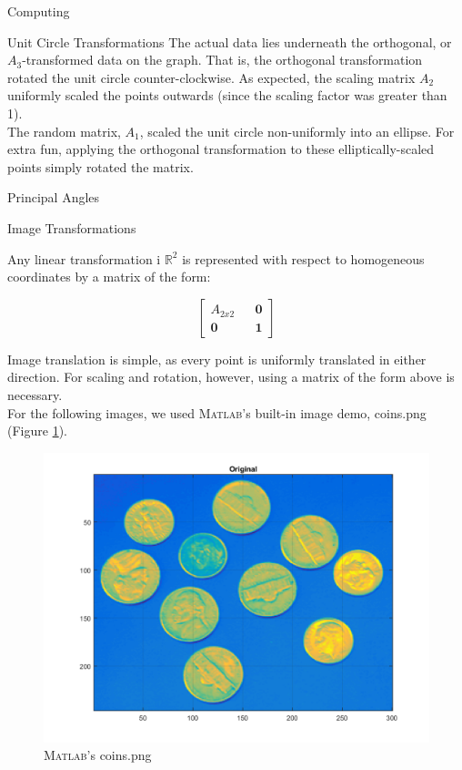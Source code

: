 \begin{section}{Computing}
\begin{homeworkSection}{Unit Circle Transformations}
The actual data lies underneath the orthogonal, or $A_3$-transformed data on the graph. That is, the orthogonal transformation rotated the unit circle counter-clockwise. As expected, the scaling matrix $A_2$ uniformly scaled the points outwards (since the scaling factor was greater than 1). 
\\

The random matrix, $A_1$, scaled the unit circle non-uniformly into an ellipse. For extra fun, applying the orthogonal transformation to these elliptically-scaled points simply rotated the matrix. 

\problemAnswer{

}
\end{homeworkSection}


\begin{homeworkSection}{Principal Angles}
\end{homeworkSection}


\begin{homeworkSection}{Image Transformations}

Any linear transformation i $\mathbb{R}^2$ is represented with respect to homogeneous coordinates by a matrix of the form:

$$
    \begin{bmatrix}
        A_{2 x 2} && \mathbf{0} \\ \mathbf{0}  && \mathbf{1}
    \end{bmatrix}
$$

Image translation is simple, as every point is uniformly translated in either direction. For scaling and rotation, however, using a matrix of the form above is necessary. \\

For the following images, we used \textsc{Matlab}'s built-in image demo, coins.png (Figure \ref{fig:orig}).

\begin{figure}[!h]
\centering
\includegraphics[width=0.75\columnwidth]{../data/orig} %
\caption{\textsc{Matlab}'s coins.png}
\label{fig:orig}
\end{figure}



\end{homeworkSection}
\end{section}
